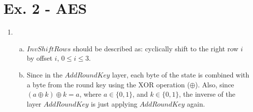 \documentclass[11pt,a4paper]{article}
\begin{document}
\section*{Ex. 2 - AES}
\begin{enumerate}
	\item
	\begin{enumerate}[(a)]
		\item $\mathit{InvShiftRows}$ should be described as: cyclically shift to the right row $i$ by offset $i$, $0 \leq i \leq 3$.
		
		\item Since in the $\mathit{AddRoundKey}$ layer, each byte of the state is combined with a byte from the round key using the $\mathrm{XOR}$ operation ($\oplus$). Also, since $(a\oplus k)\oplus k = a$, where $a\in \{0, 1\}$, and $k\in \{0, 1\}$, the inverse of the layer $\mathit{AddRoundKey}$ is just applying $\mathit{AddRoundKey}$ again.
		

\end{enumerate}
\end{enumerate}
\end{document}
